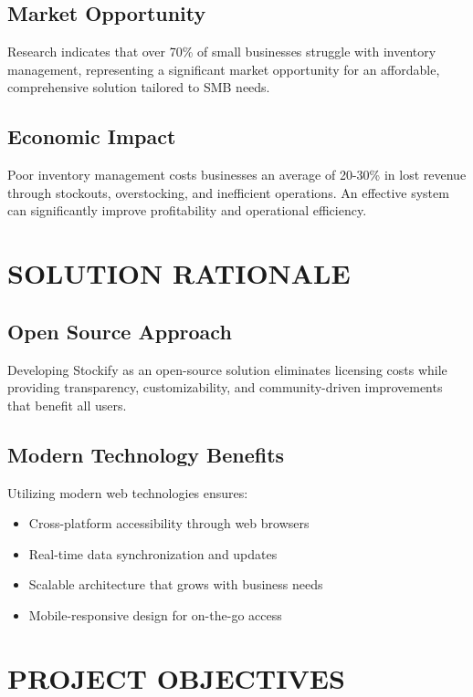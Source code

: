 \subsection{Market Opportunity}
Research indicates that over 70\% of small businesses struggle with inventory management, representing a significant market opportunity for an affordable, comprehensive solution tailored to SMB needs.

\subsection{Economic Impact}
Poor inventory management costs businesses an average of 20-30\% in lost revenue through stockouts, overstocking, and inefficient operations. An effective system can significantly improve profitability and operational efficiency.

\section{SOLUTION RATIONALE}

\subsection{Open Source Approach}
Developing Stockify as an open-source solution eliminates licensing costs while providing transparency, customizability, and community-driven improvements that benefit all users.

\subsection{Modern Technology Benefits}
Utilizing modern web technologies ensures:
\begin{itemize}
\item Cross-platform accessibility through web browsers
\item Real-time data synchronization and updates
\item Scalable architecture that grows with business needs
\item Mobile-responsive design for on-the-go access
\end{itemize}

\section{PROJECT OBJECTIVES}

